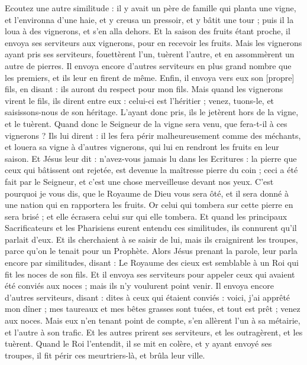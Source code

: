 \begin{multicols}{2}
Ecoutez une autre similitude : il y avait un père de famille qui planta une vigne, et l'environna d'une haie, et y creusa un pressoir, et y bâtit une tour ; puis il la loua à des vignerons, et s'en alla dehors.
Et la saison des fruits étant proche, il envoya ses serviteurs aux vignerons, pour en recevoir les fruits.
Mais les vignerons ayant pris ses serviteurs, fouettèrent l'un, tuèrent l'autre, et en assommèrent un autre de pierres.
Il envoya encore d'autres serviteurs en plus grand nombre que les premiers, et ils leur en firent de même.
Enfin, il envoya vers eux son [propre] fils, en disant : ils auront du respect pour mon fils.
Mais quand les vignerons virent le fils, ils dirent entre eux : celui-ci est l'héritier ; venez, tuons-le, et saisissons-nous de son héritage.
L'ayant donc pris, ils le jetèrent hors de la vigne, et le tuèrent.
Quand donc le Seigneur de la vigne sera venu, que fera-t-il à ces vignerons ?
Ils lui dirent : il les fera périr malheureusement comme des méchants, et louera sa vigne à d'autres vignerons, qui lui en rendront les fruits en leur saison.
Et Jésus leur dit : n'avez-vous jamais lu dans les Ecritures : la pierre que ceux qui bâtissent ont rejetée, est devenue la maîtresse pierre du coin ; ceci a été fait par le Seigneur, et c'est une chose merveilleuse devant nos yeux.
C'est pourquoi je vous dis, que le Royaume de Dieu vous sera ôté, et il sera donné à une nation qui en rapportera les fruits.
Or celui qui tombera sur cette pierre en sera brisé ; et elle écrasera celui sur qui elle tombera.
Et quand les principaux Sacrificateurs et les Pharisiens eurent entendu ces similitudes, ils connurent qu'il parlait d'eux.
Et ils cherchaient à se saisir de lui, mais ils craignirent les troupes, parce qu'on le tenait pour un Prophète.
\VerseOne{}Alors Jésus prenant la parole, leur parla encore par similitudes, disant :
Le Royaume des cieux est semblable à un Roi qui fit les noces de son fils.
Et il envoya ses serviteurs pour appeler ceux qui avaient été conviés aux noces ; mais ils n'y voulurent point venir.
Il envoya encore d'autres serviteurs, disant : dites à ceux qui étaient conviés : voici, j'ai apprêté mon dîner ; mes taureaux et mes bêtes grasses sont tuées, et tout est prêt ; venez aux noces.
Mais eux n'en tenant point de compte, s'en allèrent l'un à sa métairie, et l'autre à son trafic.
Et les autres prirent ses serviteurs, et les outragèrent, et les tuèrent.
Quand le Roi l'entendit, il se mit en colère, et y ayant envoyé ses troupes, il fit périr ces meurtriers-là, et brûla leur ville.

\end{multicols}
